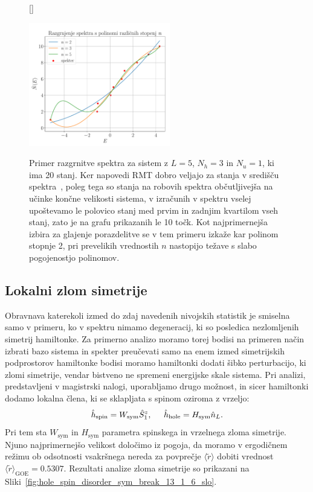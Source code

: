 \begin{figure}[H]
[\FBwidth]
{\caption{Primer razgrnitve spektra za sistem z $L=5$, $N_h=3$ in $N_u=1$, ki ima 20 stanj. Ker napovedi RMT dobro veljajo za stanja v središču spektra~\cite{d2016quantum}, poleg tega so stanja na robovih spektra občutljivejša na učinke končne velikosti sistema, v izračunih v spektru vselej upoštevamo le polovico stanj med prvim in zadnjim kvartilom vseh stanj, zato je na grafu prikazanih le 10 točk. Kot najprimernejša izbira za glajenje porazdelitve se v tem primeru izkaže kar polinom stopnje 2, pri prevelikih vrednostih $n$ nastopijo težave s slabo pogojenostjo polinomov. }\label{fig:unfolding_schematics}}
{\includegraphics[width=0.55\textwidth]{unfolding_schematics.pdf}}
\end{figure}
\subsection{Lokalni zlom simetrije}
\label{lokalni_zlom_simetrije}
Obravnava katerekoli izmed do zdaj navedenih nivojskih statistik je smiselna samo v primeru, ko v spektru nimamo degeneracij, ki so posledica nezlomljenih simetrij hamiltonke. Za primerno analizo moramo torej bodisi na primeren način izbrati bazo sistema in spekter preučevati samo na enem izmed simetrijskih podprostorov hamiltonke bodisi moramo hamiltonki dodati šibko perturbacijo, ki zlomi simetrije, vendar bistveno ne spremeni energijske skale sistema. Pri analizi, predstavljeni v magistrski nalogi, uporabljamo drugo možnost, in sicer hamiltonki dodamo lokalna člena, ki se sklapljata s spinom oziroma z vrzeljo:
\begin{equation}\label{eq:sym_break_terms}
\hat{h}_\mathrm{spin}=W_\mathrm{sym}\hat{S}_1^z, \hspace{5mm} \hat{h}_\mathrm{hole}=H_\mathrm{sym}\hat{n}_L.
\end{equation}
Pri tem sta $W_\mathrm{sym}$ in $H_\mathrm{sym}$ parametra spinskega in vrzelnega zloma simetrije. Njuno najprimernejšo velikost določimo iz pogoja, da moramo v ergodičnem režimu ob odsotnosti vsakršnega nereda za povprečje $\langle\tilde{r} \rangle$ dobiti vrednost $\langle\tilde{r}\rangle_\mathrm{GOE}=0.5307$. Rezultati analize zloma simetrije so prikazani na Sliki~\ref{fig:hole_spin_disorder_sym_break_13_1_6_slo}.

